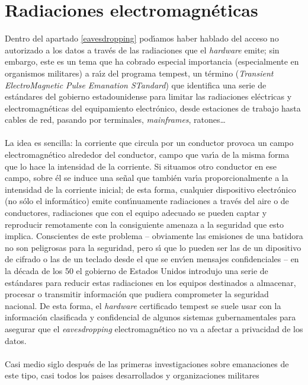 \section{Radiaciones electromagn\'eticas}
Dentro del apartado \ref{eavesdropping} 
pod\'{\i}amos haber hablado del acceso no autorizado a los datos a trav\'es de
las radiaciones que el {\it hardware} emite; sin embargo, este es un tema que ha
cobrado especial importancia (especialmente en organismos militares) a 
ra\'{\i}z del programa {\sc tempest}, un t\'ermino ({\it Transient 
ElectroMagnetic Pulse Emanation STandard}) que identifica una serie de 
est\'andares del gobierno estadounidense para limitar las radiaciones 
el\'ectricas y electromagn\'eticas del equipamiento electr\'onico, desde 
estaciones de trabajo hasta cables de red, pasando por terminales, {\it 
mainframes}, ratones\ldots\\
\\La idea es sencilla: la corriente que circula por un conductor provoca un
campo electromagn\'etico alrededor del conductor, campo que var\'{\i}a de la
misma forma que lo hace la intensidad de la corriente. Si situamos otro 
conductor en ese campo, sobre \'el se induce una se\~nal que tambi\'en 
var\'{\i}a proporcionalmente a la intensidad de la corriente inicial; de esta
forma, cualquier dispositivo electr\'onico (no s\'olo el inform\'atico) emite 
cont\'{\i}nuamente radiaciones a trav\'es del aire o de conductores, 
radiaciones que con el equipo adecuado se pueden captar y reproducir 
remotamente con la consiguiente amenaza a la seguridad que esto implica. 
Conscientes de este problema -- obviamente las emisiones de una batidora no son
peligrosas para la seguridad, pero s\'{\i} que lo pueden ser las de un 
dipositivo de cifrado o las de un teclado desde el que se env\'{\i}en mensajes
confidenciales -- en la d\'ecada de los 50 el gobierno de Estados Unidos 
introdujo una serie de est\'andares para reducir estas radiaciones en los 
equipos destinados a almacenar, procesar o transmitir informaci\'on que 
pudiera comprometer la seguridad nacional. De esta forma, el {\it hardware} 
certificado {\sc tempest} se suele usar con la informaci\'on clasificada y 
confidencial de algunos sistemas gubernamentales para asegurar que el {\it 
eavesdropping} electromagn\'etico no va a afectar a privacidad de los datos.\\
\\Casi medio siglo despu\'es de las primeras investigaciones sobre emanaciones
de este tipo, casi todos los paises desarrollados y organizaciones militares
